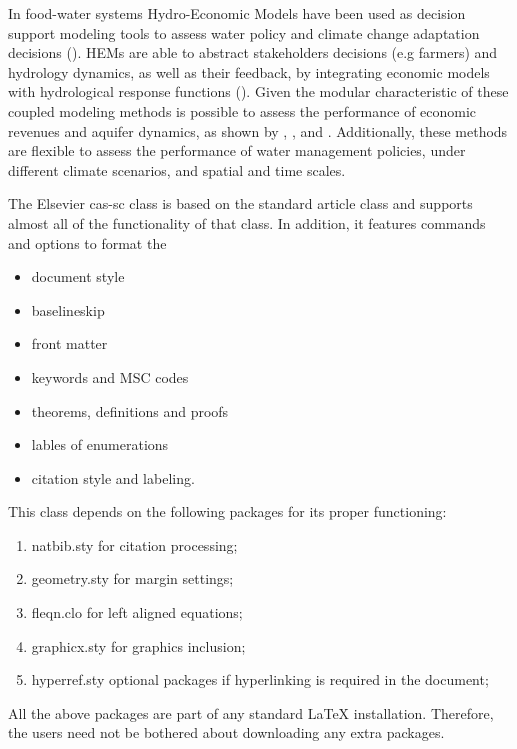 \documentclass[a4paper,fleqn]{cas-sc}
\begin{document}
In food-water systems Hydro-Economic Models have been used as decision support modeling tools to assess water policy and climate change adaptation decisions (\citep{ward_hydroeconomic_2021,harou_hydro-economic_2009}). HEMs are able to abstract stakeholders decisions (e.g farmers) and hydrology dynamics, as well as their feedback, by integrating economic models with hydrological response functions (\citep{harou_hydro-economic_2009}). Given the modular characteristic of these coupled modeling methods is possible to assess the performance of economic revenues and aquifer dynamics, as shown by \textcite{macewan_hydroeconomic_2017}, \textcite{afshar_multi-objective_2020}, \textcite{rodriguez-flores_global_2022} and \textcite{graveline_combining_2020}. Additionally, these methods are flexible to assess the performance of water management policies, under different climate scenarios, and spatial and time scales.


The Elsevier cas-sc class is based on the
standard article class and supports almost all of the functionality of
that class. In addition, it features commands and options to format the
\begin{itemize} \item document style \item baselineskip \item front
matter \item keywords and MSC codes \item theorems, definitions and
proofs \item lables of enumerations \item citation style and labeling.
\end{itemize}

This class depends on the following packages
for its proper functioning:

\begin{enumerate}
\itemsep=0pt
\item {natbib.sty} for citation processing;
\item {geometry.sty} for margin settings;
\item {fleqn.clo} for left aligned equations;
\item {graphicx.sty} for graphics inclusion;
\item {hyperref.sty} optional packages if hyperlinking is
  required in the document;
\end{enumerate}  

All the above packages are part of any
standard \LaTeX{} installation.
Therefore, the users need not be
bothered about downloading any extra packages.
\end{document}
